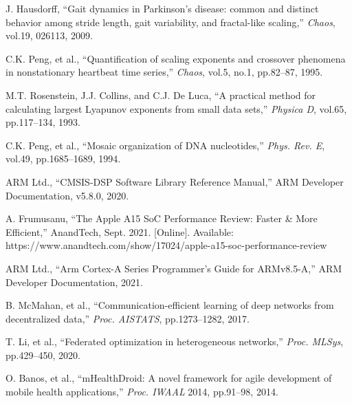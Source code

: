 \documentclass[paper]{ieice}
\begin{document}
\begin{thebibliography}{99}
J. Hausdorff, ``Gait dynamics in Parkinson's disease: common and distinct behavior among stride length, gait variability, and fractal-like scaling,'' \textit{Chaos}, vol.19, 026113, 2009.

C.K. Peng, et al., ``Quantification of scaling exponents and crossover phenomena in nonstationary heartbeat time series,'' \textit{Chaos}, vol.5, no.1, pp.82--87, 1995.

M.T. Rosenstein, J.J. Collins, and C.J. De Luca, ``A practical method for calculating largest Lyapunov exponents from small data sets,'' \textit{Physica D}, vol.65, pp.117--134, 1993.

C.K. Peng, et al., ``Mosaic organization of DNA nucleotides,'' \textit{Phys. Rev. E}, vol.49, pp.1685--1689, 1994.

ARM Ltd., ``CMSIS-DSP Software Library Reference Manual,'' ARM Developer Documentation, v5.8.0, 2020.

A. Frumusanu, ``The Apple A15 SoC Performance Review: Faster & More Efficient,'' AnandTech, Sept. 2021. [Online]. Available: https://www.anandtech.com/show/17024/apple-a15-soc-performance-review

ARM Ltd., ``Arm Cortex-A Series Programmer's Guide for ARMv8.5-A,'' ARM Developer Documentation, 2021.

B. McMahan, et al., ``Communication-efficient learning of deep networks from decentralized data,'' \textit{Proc. AISTATS}, pp.1273--1282, 2017.

T. Li, et al., ``Federated optimization in heterogeneous networks,'' \textit{Proc. MLSys}, pp.429--450, 2020.

O. Banos, et al., ``mHealthDroid: A novel framework for agile development of mobile health applications,'' \textit{Proc. IWAAL} 2014, pp.91--98, 2014.

\end{thebibliography}
\end{document}
